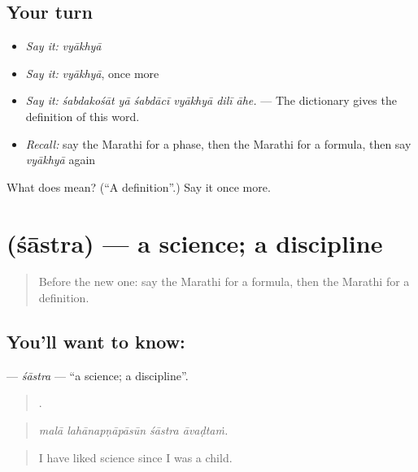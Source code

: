 \subsection*{Your turn}
\begin{itemize}
\raggedright
  \item \emph{Say it:} \emph{vyākhyā}
  \item \emph{Say it:} \emph{vyākhyā}, once more
  \item \emph{Say it:} \emph{śabdakośāt yā śabdācī vyākhyā dilī āhe.} — The dictionary gives the definition of this word.
  \item \emph{Recall:} say the Marathi for a phase, then the Marathi for a formula, then say \emph{vyākhyā} again
\end{itemize}

\begin{tcolorbox}[breakable,colback=teal!4,colframe=teal!35!black,title={Before you move on}]
What does  mean? (\textquotedblleft{}A definition\textquotedblright{}.) Say it once more.
\end{tcolorbox}
\section[\texorpdfstring{\mr{शास्त्र} (śāstra)}{शास्त्र (śāstra)}]{ (śāstra) — a science; a discipline}

\label{lesson:MR-C374-sastra}



\begin{quote}
Before the new one: say the Marathi for a formula, then the Marathi for a definition.
\end{quote}

\subsection*{You'll want to know: }
\textbf{} — \emph{śāstra} — \textquotedblleft{}a science; a discipline\textquotedblright{}.

\begin{quote}
   .
\end{quote}

\begin{quote}
\emph{malā lahānapṇāpāsūn śāstra āvaḍtaṁ.}
\end{quote}

\begin{quote}
I have liked science since I was a child.
\end{quote}

